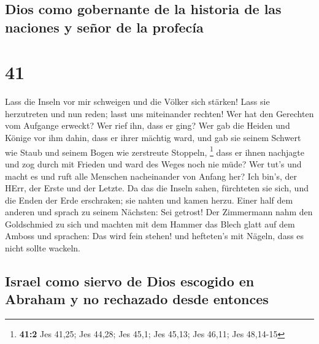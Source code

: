 \hypertarget{dios-como-gobernante-de-la-historia-de-las-naciones-y-seuxf1or-de-la-profecuxeda}{%
\subsection{Dios como gobernante de la historia de las naciones y señor
de la
profecía}\label{dios-como-gobernante-de-la-historia-de-las-naciones-y-seuxf1or-de-la-profecuxeda}}

\hypertarget{section-40}{%
\section{41}\label{section-40}}

 Lass die Inseln vor mir schweigen und die Völker sich
stärken! Lass sie herzutreten und nun reden; lasst uns miteinander
rechten!  Wer hat den Gerechten vom Aufgange erweckt? Wer
rief ihn, dass er ging? Wer gab die Heiden und Könige vor ihm dahin,
dass er ihrer mächtig ward, und gab sie seinem Schwert wie Staub und
seinem Bogen wie zerstreute Stoppeln, \footnote{\textbf{41:2} Jes 41,25;
  Jes 44,28; Jes 45,1; Jes 45,13; Jes 46,11; Jes 48,14-15}
 dass er ihnen nachjagte und zog durch mit Frieden und
ward des Weges noch nie müde?  Wer tut's und macht es und
ruft alle Menschen nacheinander von Anfang her? Ich bin's, der HErr, der
Erste und der Letzte.  Da das die Inseln sahen, fürchteten
sie sich, und die Enden der Erde erschraken; sie nahten und kamen herzu.
 Einer half dem anderen und sprach zu seinem Nächsten: Sei
getrost!  Der Zimmermann nahm den Goldschmied zu sich und
machten mit dem Hammer das Blech glatt auf dem Amboss und sprachen: Das
wird fein stehen! und hefteten's mit Nägeln, dass es nicht sollte
wackeln.

\hypertarget{israel-como-siervo-de-dios-escogido-en-abraham-y-no-rechazado-desde-entonces}{%
\subsection{Israel como siervo de Dios escogido en Abraham y no
rechazado desde
entonces}\label{israel-como-siervo-de-dios-escogido-en-abraham-y-no-rechazado-desde-entonces}}

